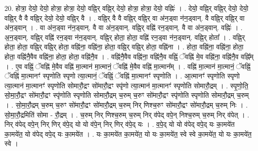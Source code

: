 \documentclass[17pt]{extarticle}
\begin{document}
20. होत्रा॒ देयो॒ देयो॒ होत्रा॒ होत्रा॒ देयो॒ वह्नि॒र् वह्नि॒र् देयो॒ होत्रा॒ होत्रा॒ देयो॒ वह्निः॑ । . देयो॒ वह्नि॒र् वह्नि॒र् देयो॒ देयो॒ वह्नि॒र् वै वै वह्नि॒र् देयो॒ देयो॒ वह्नि॒र् वै । . वह्नि॒र् वै वै वह्नि॒र् वह्नि॒र् वा अ॑न॒ड्वा न॑न॒ड्वान्. वै वह्नि॒र् वह्नि॒र् वा अ॑न॒ड्वान् । . वा अ॑न॒ड्वा न॑न॒ड्वान्. वै वा अ॑न॒ड्वान्. वह्नि॒र् वह्नि॑ रन॒ड्वान्. वै वा अ॑न॒ड्वान्. वह्निः॑ । . अ॒न॒ड्वान्. वह्नि॒र् वह्नि॑ रन॒ड्वा न॑न॒ड्वान्. वह्नि॒र् होता॒ होता॒ वह्नि॑ रन॒ड्वा न॑न॒ड्वान्. वह्नि॒र् होता᳚ । . वह्नि॒र् होता॒ होता॒ वह्नि॒र् वह्नि॒र् होता॒ वह्नि॑ना॒ वह्नि॑ना॒ होता॒ वह्नि॒र् वह्नि॒र् होता॒ वह्नि॑ना । . होता॒ वह्नि॑ना॒ वह्नि॑ना॒ होता॒ होता॒ वह्नि॑नै॒वैव वह्नि॑ना॒ होता॒ होता॒ वह्नि॑नै॒व । . वह्नि॑नै॒वैव वह्नि॑ना॒ वह्नि॑नै॒व वह्निं॒ ॅवह्नि॑ मे॒व वह्नि॑ना॒ वह्नि॑नै॒व वह्नि᳚म् । . ए॒व वह्निं॒ ॅवह्नि॑ मे॒वैव वह्नि॑ मा॒त्मान॑ मा॒त्मानं॒ ॅवह्नि॑ मे॒वैव वह्नि॑ मा॒त्मान᳚म् । . वह्नि॑ मा॒त्मान॑ मा॒त्मानं॒ ॅवह्निं॒ ॅवह्नि॑ मा॒त्मानꣳ॑ स्पृणोति स्पृणो त्या॒त्मानं॒ ॅवह्निं॒ ॅवह्नि॑ मा॒त्मानꣳ॑ स्पृणोति । . आ॒त्मानꣳ॑ स्पृणोति स्पृणो त्या॒त्मान॑ मा॒त्मानꣳ॑ स्पृणोति सोमारौ॒द्रꣳ सो॑मारौ॒द्रꣳ स्पृ॑णो त्या॒त्मान॑ मा॒त्मानꣳ॑ स्पृणोति सोमारौ॒द्रम् । . स्पृ॒णो॒ति॒ सो॒मा॒रौ॒द्रꣳ सो॑मारौ॒द्रꣳ स्पृ॑णोति स्पृणोति सोमारौ॒द्रम् च॒रुम् च॒रुꣳ सो॑मारौ॒द्रꣳ स्पृ॑णोति स्पृणोति सोमारौ॒द्रम् च॒रुम् । . सो॒मा॒रौ॒द्रम् च॒रुम् च॒रुꣳ सो॑मारौ॒द्रꣳ सो॑मारौ॒द्रम् च॒रुम् निर् णिश्च॒रुꣳ सो॑मारौ॒द्रꣳ सो॑मारौ॒द्रम् च॒रुम् निः । . सो॒मा॒रौ॒द्रमिति॑ सोमा - रौ॒द्रम् । . च॒रुम् निर् णिश्च॒रुम् च॒रुम् निर् व॑पेद् वपे॒न् निश्च॒रुम् च॒रुम् निर् व॑पेत् । . निर् व॑पेद् वपे॒न् निर् णिर् व॑पे॒द् यो यो व॑पे॒न् निर् णिर् व॑पे॒द् यः । . व॒पे॒द् यो यो व॑पेद् वपे॒द् यः का॒मये॑त का॒मये॑त॒ यो व॑पेद् वपे॒द् यः का॒मये॑त । . यः का॒मये॑त का॒मये॑त॒ यो यः का॒मये॑त॒ स्वे स्वे का॒मये॑त॒ यो यः का॒मये॑त॒ स्वे । \newline
\end{document}
